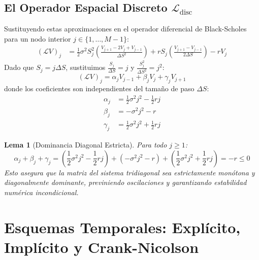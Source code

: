\documentclass[11pt,a4paper]{article}
\newtheorem{lemma}[theorem]{Lema}
\begin{document}
\subsection{El Operador Espacial Discreto $\mathcal{L}_{\text{disc}}$}
Sustituyendo estas aproximaciones en el operador diferencial de Black-Scholes para un nodo interior $j \in \{1, \dots, M-1\}$:
\begin{align}
    (\mathcal{L} V)_j &= \frac{1}{2} \sigma^2 S_j^2 \left( \frac{V_{j+1} - 2V_j + V_{j-1}}{\Delta S^2} \right) + r S_j \left( \frac{V_{j+1} - V_{j-1}}{2 \Delta S} \right) - r V_j
\end{align}
Dado que $S_j = j \Delta S$, sustituimos $\frac{S_j}{\Delta S} = j$ y $\frac{S_j^2}{\Delta S^2} = j^2$:
\begin{equation}
    (\mathcal{L} V)_j = \alpha_j V_{j-1} + \beta_j V_j + \gamma_j V_{j+1}
\end{equation}
donde los coeficientes son independientes del tamaño de paso $\Delta S$:
\begin{align}
    \alpha_j &= \frac{1}{2} \sigma^2 j^2 - \frac{1}{2} r j \\
    \beta_j &= -\sigma^2 j^2 - r \\
    \gamma_j &= \frac{1}{2} \sigma^2 j^2 + \frac{1}{2} r j
\end{align}
\begin{lemma}[Dominancia Diagonal Estricta]
Para todo $j \ge 1$:
\begin{equation}
    \alpha_j + \beta_j + \gamma_j = \left( \frac{1}{2}\sigma^2 j^2 - \frac{1}{2}r j \right) + (-\sigma^2 j^2 - r) + \left( \frac{1}{2}\sigma^2 j^2 + \frac{1}{2}r j \right) = -r \le 0
\end{equation}
Esto asegura que la matriz del sistema tridiagonal sea estrictamente monótona y diagonalmente dominante, previniendo oscilaciones y garantizando estabilidad numérica incondicional.
\end{lemma}

\newpage
\section{Esquemas Temporales: Explícito, Implícito y Crank-Nicolson}
\end{document}
